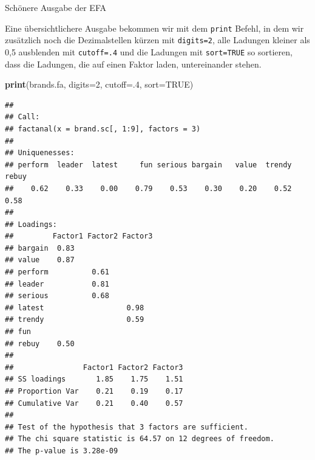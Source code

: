\documentclass[12pt,ngerman,a4paper,ignorenonframetext,]{beamer}
\newenvironment{Shaded}{\begin{snugshade}}{\end{snugshade}}
\newcommand{\DataTypeTok}[1]{\textcolor[rgb]{0.13,0.29,0.53}{#1}}
\newcommand{\DecValTok}[1]{\textcolor[rgb]{0.00,0.00,0.81}{#1}}
\newcommand{\KeywordTok}[1]{\textcolor[rgb]{0.13,0.29,0.53}{\textbf{#1}}}
\newcommand{\NormalTok}[1]{#1}
\newcommand{\OtherTok}[1]{\textcolor[rgb]{0.56,0.35,0.01}{#1}}
\begin{document}
\begin{frame}{Schönere Ausgabe der EFA}
\protect\hypertarget{schonere-ausgabe-der-efa}{}

Eine übersichtlichere Ausgabe bekommen wir mit dem \texttt{print}
Befehl, in dem wir zusätzlich noch die Dezimalstellen kürzen mit
\texttt{digits=2}, alle Ladungen kleiner als 0,5 ausblenden mit
\texttt{cutoff=.4} und die Ladungen mit \texttt{sort=TRUE} so sortieren,
dass die Ladungen, die auf einen Faktor laden, untereinander stehen.

\begin{Shaded}
\begin{Highlighting}[]
\KeywordTok{print}\NormalTok{(brands.fa, }\DataTypeTok{digits=}\DecValTok{2}\NormalTok{, }\DataTypeTok{cutoff=}\NormalTok{.}\DecValTok{4}\NormalTok{, }\DataTypeTok{sort=}\OtherTok{TRUE}\NormalTok{)}
\end{Highlighting}
\end{Shaded}

\begin{verbatim}
## 
## Call:
## factanal(x = brand.sc[, 1:9], factors = 3)
## 
## Uniquenesses:
## perform  leader  latest     fun serious bargain   value  trendy   rebuy 
##    0.62    0.33    0.00    0.79    0.53    0.30    0.20    0.52    0.58 
## 
## Loadings:
##         Factor1 Factor2 Factor3
## bargain  0.83                  
## value    0.87                  
## perform          0.61          
## leader           0.81          
## serious          0.68          
## latest                   0.98  
## trendy                   0.59  
## fun                            
## rebuy    0.50                  
## 
##                Factor1 Factor2 Factor3
## SS loadings       1.85    1.75    1.51
## Proportion Var    0.21    0.19    0.17
## Cumulative Var    0.21    0.40    0.57
## 
## Test of the hypothesis that 3 factors are sufficient.
## The chi square statistic is 64.57 on 12 degrees of freedom.
## The p-value is 3.28e-09
\end{verbatim}

\end{frame}
\end{document}
